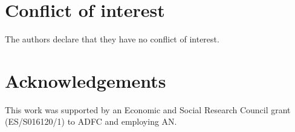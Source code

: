 \documentclass[preprint,12pt,authoryear]{elsarticle}
\begin{document}
\section*{Conflict of interest}
The authors declare that they have no conflict of interest.

\section*{Acknowledgements}
This work was supported by an Economic and Social Research Council grant (ES/S016120/1) to ADFC and employing AN.

\end{document}
